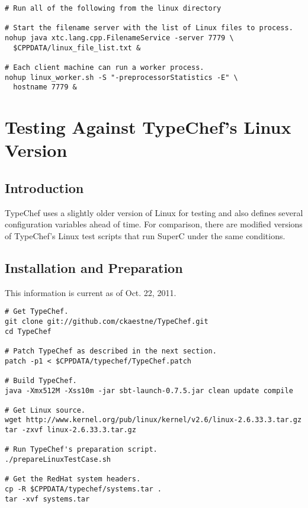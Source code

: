 \documentclass{report}
\newcommand{\SuperC}{{\textsf{Su\-perC}}}
\begin{document}
\begin{verbatim}
# Run all of the following from the linux directory

# Start the filename server with the list of Linux files to process.
nohup java xtc.lang.cpp.FilenameService -server 7779 \
  $CPPDATA/linux_file_list.txt &

# Each client machine can run a worker process.
nohup linux_worker.sh -S "-preprocessorStatistics -E" \
  hostname 7779 &
\end{verbatim}




\chapter{Testing Against TypeChef's Linux Version}



\section{Introduction}

TypeChef uses a slightly older version of Linux for testing and also
defines several configuration variables ahead of time.  For
comparison, there are modified versions of TypeChef's Linux test
scripts that run \SuperC{} under the same conditions.

\section{Installation and Preparation}

This information is current as of Oct. 22, 2011.

\begin{verbatim}
# Get TypeChef.
git clone git://github.com/ckaestne/TypeChef.git
cd TypeChef

# Patch TypeChef as described in the next section.
patch -p1 < $CPPDATA/typechef/TypeChef.patch

# Build TypeChef.
java -Xmx512M -Xss10m -jar sbt-launch-0.7.5.jar clean update compile

# Get Linux source.
wget http://www.kernel.org/pub/linux/kernel/v2.6/linux-2.6.33.3.tar.gz
tar -zxvf linux-2.6.33.3.tar.gz

# Run TypeChef's preparation script.
./prepareLinuxTestCase.sh

# Get the RedHat system headers.
cp -R $CPPDATA/typechef/systems.tar .
tar -xvf systems.tar 


\end{verbatim}
\end{document}
